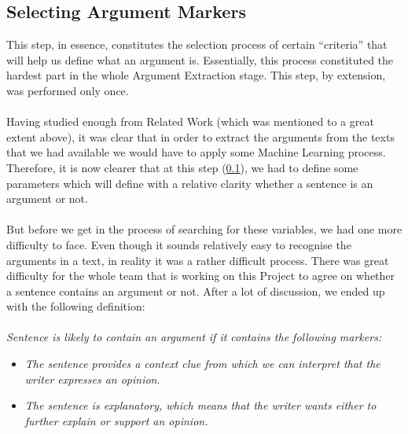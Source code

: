 \subsection{Selecting Argument Markers}\label{321_ref}
This step, in essence, constitutes the selection process of certain ``criteria'' that will help us define what an argument is. Essentially, this process constituted the hardest part in the whole Argument Extraction stage. This step, by extension, was performed only once.\\
\\
Having studied enough from Related Work (which was mentioned to a great extent above), it was clear that in order to extract the arguments from the texts that we had available we would have to apply some Machine Learning process. Therefore, it is now clearer that at this step (\ref{321_ref}), we had to define some parameters which will define with a relative clarity whether a sentence is an argument or not.\\
\\
But before we get in the process of searching for these variables, we had one more difficulty to face. Even though it sounds relatively easy to recognise the arguments in a text, in reality it was a rather difficult process. There was great difficulty for the whole team that is working on this Project to agree on whether a sentence contains an argument or not. After a lot of discussion, we ended up with the following definition:\\
\\
\textit{Sentence is likely to contain an argument if it contains the following markers:\\}
\begin{itemize}

	\item \textit{The sentence provides a context clue from which we can interpret that the writer expresses an opinion}.
	\item \textit{The sentence is explanatory, which means that the writer wants either to further explain or support an opinion.\\}
	
\end{itemize}

